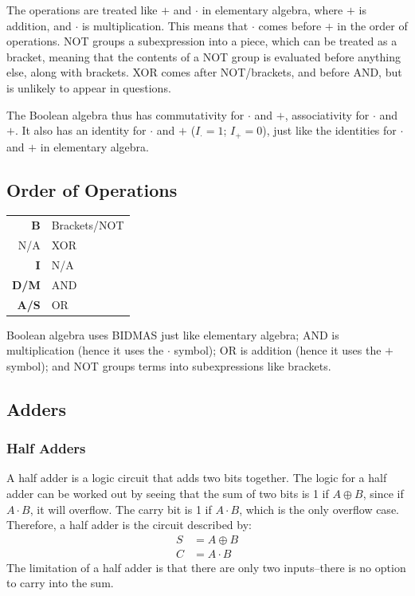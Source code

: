             The operations are treated like $+$ and $\cdot$ in elementary algebra, where $+$ is addition, and $\cdot$ is multiplication.
            This means that $\cdot$ comes before $+$ in the order of operations.
            NOT groups a subexpression into a piece, which can be treated as a bracket, meaning that the contents of a NOT group is evaluated before anything else, along with brackets.
            XOR comes after NOT/brackets, and before AND, but is unlikely to appear in questions.

            The Boolean algebra thus has commutativity for $\cdot$ and $+$, associativity for $\cdot$ and $+$.
            It also has an identity for $\cdot$ and $+$ ($I_\cdot=1$; $I_+=0$), just like the identities for $\cdot$ and $+$ in elementary algebra.

            \subsection{Order of Operations}
                \begin{center}
                    \begin{tabular}{r l}
                        \textbf{B} & Brackets/NOT \\
                        N/A & XOR \\
                        \textbf{I} & N/A \\
                        \textbf{D/M} & AND \\
                        \textbf{A/S} & OR
                    \end{tabular}
                \end{center}
                Boolean algebra uses BIDMAS just like elementary algebra; AND is multiplication (hence it uses the $\cdot$ symbol); OR is addition (hence it uses the $+$ symbol); and NOT groups terms into subexpressions like brackets.

        \subsection{Adders}
            \subsubsection{Half Adders}
                A half adder is a logic circuit that adds two bits together.
                The logic for a half adder can be worked out by seeing that the sum of two bits is 1 if $A\oplus B$, since if $A\cdot B$, it will overflow.
                The carry bit is 1 if $A\cdot B$, which is the only overflow case.
                Therefore, a half adder is the circuit described by:
                \begin{equation}
                    \begin{aligned}
                        S&=A\oplus B \\
                        C&=A\cdot B
                    \end{aligned}
                \end{equation}
                The limitation of a half adder is that there are only two inputs--there is no option to carry into the sum.
                
